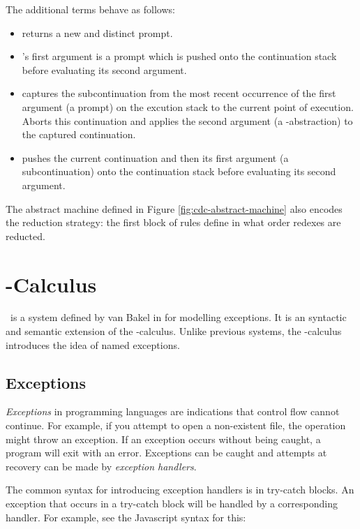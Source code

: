   The additional terms behave as follows:
  \begin{itemize}
  \item {} returns a new and distinct prompt.
  \item {}'s first argument is a prompt which is pushed onto the continuation stack before evaluating its second argument. 
  \item {} captures the subcontinuation from the most recent occurrence of the first argument (a prompt) on the excution stack to the current point of execution. Aborts this continuation and applies the second argument (a \lam-abstraction) to the captured continuation.
  \item {} pushes the current continuation and then its first argument (a subcontinuation) onto the continuation stack before evaluating its second argument.
  \end{itemize}
  
  The abstract machine defined in Figure \ref{fig:cdc-abstract-machine} also encodes the reduction strategy:
  the first block of rules define in what order redexes are reducted.
 
\section{\ltry-Calculus}

\ltry\ is a system defined by van Bakel in \cite{Bakel15} for modelling exceptions.
It is an syntactic and semantic extension of the \lam-calculus.
Unlike previous systems, the \ltry-calculus introduces the idea of named exceptions.

\subsection{Exceptions}

\emph{Exceptions} in programming languages are indications that control flow cannot continue.
For example, if you attempt to open a non-existent file,
the operation might throw an exception.
If an exception occurs without being caught, a program will exit with an error.
Exceptions can be caught and attempts at recovery can be made by \emph{exception handlers}.

The common syntax for introducing exception handlers is in try-catch blocks.
An exception that occurs in a try-catch block will be handled by a corresponding handler.
For example, see the Javascript syntax for this:

